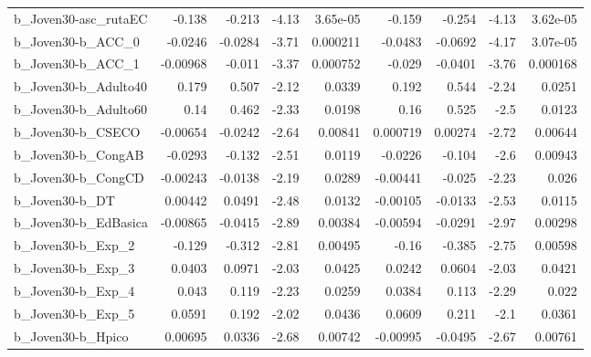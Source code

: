 \begin{tabular}{lrrrrrrrr}
b\_Joven30-asc\_rutaEC       &      -0.138 &       -0.213 &    -4.13 & 3.65e-05 &     -0.159 &      -0.254 &        -4.13 &      3.62e-05 \\
b\_Joven30-b\_ACC\_0          &     -0.0246 &      -0.0284 &    -3.71 & 0.000211 &    -0.0483 &     -0.0692 &        -4.17 &      3.07e-05 \\
b\_Joven30-b\_ACC\_1          &    -0.00968 &       -0.011 &    -3.37 & 0.000752 &     -0.029 &     -0.0401 &        -3.76 &      0.000168 \\
b\_Joven30-b\_Adulto40       &       0.179 &        0.507 &    -2.12 &   0.0339 &      0.192 &       0.544 &        -2.24 &        0.0251 \\
b\_Joven30-b\_Adulto60       &        0.14 &        0.462 &    -2.33 &   0.0198 &       0.16 &       0.525 &         -2.5 &        0.0123 \\
b\_Joven30-b\_CSECO          &    -0.00654 &      -0.0242 &    -2.64 &  0.00841 &   0.000719 &     0.00274 &        -2.72 &       0.00644 \\
b\_Joven30-b\_CongAB         &     -0.0293 &       -0.132 &    -2.51 &   0.0119 &    -0.0226 &      -0.104 &         -2.6 &       0.00943 \\
b\_Joven30-b\_CongCD         &    -0.00243 &      -0.0138 &    -2.19 &   0.0289 &   -0.00441 &      -0.025 &        -2.23 &         0.026 \\
b\_Joven30-b\_DT             &     0.00442 &       0.0491 &    -2.48 &   0.0132 &   -0.00105 &     -0.0133 &        -2.53 &        0.0115 \\
b\_Joven30-b\_EdBasica       &    -0.00865 &      -0.0415 &    -2.89 &  0.00384 &   -0.00594 &     -0.0291 &        -2.97 &       0.00298 \\
b\_Joven30-b\_Exp\_2          &      -0.129 &       -0.312 &    -2.81 &  0.00495 &      -0.16 &      -0.385 &        -2.75 &       0.00598 \\
b\_Joven30-b\_Exp\_3          &      0.0403 &       0.0971 &    -2.03 &   0.0425 &     0.0242 &      0.0604 &        -2.03 &        0.0421 \\
b\_Joven30-b\_Exp\_4          &       0.043 &        0.119 &    -2.23 &   0.0259 &     0.0384 &       0.113 &        -2.29 &         0.022 \\
b\_Joven30-b\_Exp\_5          &      0.0591 &        0.192 &    -2.02 &   0.0436 &     0.0609 &       0.211 &         -2.1 &        0.0361 \\
b\_Joven30-b\_Hpico          &     0.00695 &       0.0336 &    -2.68 &  0.00742 &   -0.00995 &     -0.0495 &        -2.67 &       0.00761 \\

\end{tabular}
